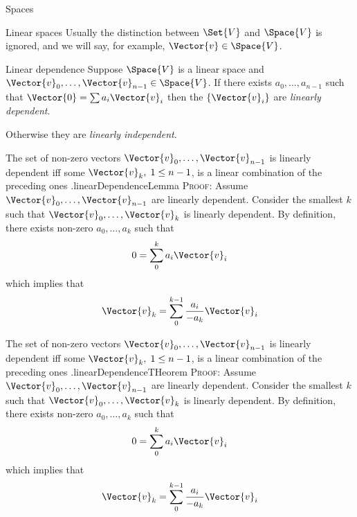 \begin{plSection}{Spaces}
\begin{plSection}{Linear spaces}
Usually the distinction between $\Set{V}$ and $\Space{V}$ 
is ignored, and we will say, for example, 
$\Vector{v} \in \Space{V}$.

\begin{plDefinition}{Linear dependence}{}
Suppose $\Space{V}$ is a linear space and
$\Vector{v}_0, \ldots , \Vector{v}_{n-1} \in \Space{V}$.
If there exists $a_0, \ldots , a_{n-1}$ such that
$\Vector{0} = \sum a_i \Vector{v}_i$ then the $\{ \Vector{v}_i \}$
are \textit{linearly dependent}.

Otherwise they are \textit{linearly independent}.
\end{plDefinition}

\begin{plLemma}{The set of non-zero vectors
 $\Vector{v}_0, \ldots ,\Vector{v}_{n-1}$
is linearly dependent iff some $\Vector{v}_k, \; 1 \leq n-1$, 
is a linear combination of the preceding 
ones .}{linearDependenceLemma}
\textsc{Proof:}
Assume  $\Vector{v}_0, \ldots ,\Vector{v}_{n-1}$ are linearly dependent.
Consider the smallest $k$ such that 
$\Vector{v}_0, \ldots ,\Vector{v}_{k}$ is linearly dependent.
By definition,
there exists non-zero $a_0, \ldots ,a_{k}$ such that
\begin{equation}
0 = \sum_0^k a_i \Vector{v}_i
\end{equation}
which implies that
\begin{equation}
\Vector{v}_k = \sum_0^{k-1} \frac{a_i}{- a_k} \Vector{v}_i
\end{equation}
\end{plLemma}

\begin{plTheorem}{The set of non-zero vectors
 $\Vector{v}_0, \ldots ,\Vector{v}_{n-1}$
is linearly dependent iff some $\Vector{v}_k, \; 1 \leq n-1$, 
is a linear combination of the preceding 
ones .}{linearDependenceTHeorem}
\textsc{Proof:}
Assume  $\Vector{v}_0, \ldots ,\Vector{v}_{n-1}$ are linearly dependent.
Consider the smallest $k$ such that 
$\Vector{v}_0, \ldots ,\Vector{v}_{k}$ is linearly dependent.
By definition,
there exists non-zero $a_0, \ldots ,a_{k}$ such that
\begin{equation}
0 = \sum_0^k a_i \Vector{v}_i
\end{equation}
which implies that
\begin{equation}
\Vector{v}_k = \sum_0^{k-1} \frac{a_i}{- a_k} \Vector{v}_i
\end{equation}
\end{plTheorem}


\end{plSection}
\end{plSection}
